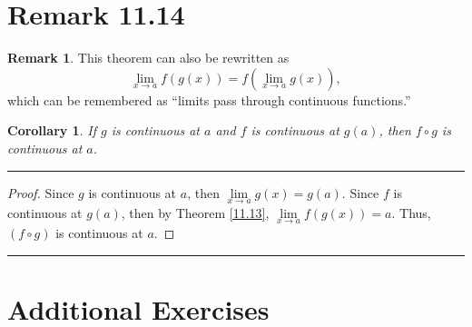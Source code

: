 \documentclass[openany, amssymb, psamsfonts]{amsart}
\newtheorem{cor}{Corollary}[section]
\theoremstyle{definition}
\newtheorem{rem}{Remark}[section]
\numberwithin{equation}{section}
\begin{document}
\section*{Remark 11.14}
\begin{rem} \label{11.14}
	This theorem can also be rewritten as
	\[
		\lim\limits_{x\to a} f(g(x)) = f\left(\lim\limits_{x\to a} g(x)\right),
	\]
	which can be remembered as ``limits pass through continuous functions.''
\end{rem}

\begin{cor}\label{11.15}
	If $g$ is continuous at $a$ and $f$ is continuous at $g(a)$, then $f\circ g$ is continuous at $a$.
\end{cor}
 \vspace{4pt}     \hrule   \vspace{4pt} \begin{proof}
Since $g$ is continuous at $a$, then $\lim\limits_{x\to a}g(x) = g(a)$. Since $f$ is continuous at $g(a)$, then by Theorem \ref{11.13}, $\lim\limits_{x\to a}f(g(x)) = a$. Thus, $(f \circ g)$ is continuous at $a$.
\end{proof} \vspace{4pt}     \hrule   \vspace{4pt}

\section*{Additional Exercises}
\end{document}
